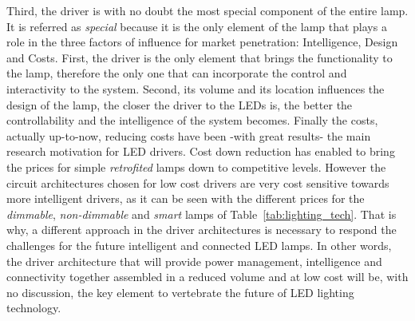 Third, the driver is with no doubt the most special component of the entire lamp. It is referred as \emph{special} because it is the only element of the lamp that plays a role in the three factors of influence for market penetration: Intelligence, Design and Costs. First, the driver is the only element that brings the functionality to the lamp, therefore the only one that can incorporate the control and interactivity to the system. Second, its volume and its location influences the design of the lamp, the closer the driver to the LEDs is, the better the controllability and the intelligence of the system becomes. Finally the costs, actually up-to-now, reducing costs have been -with great results- the main research motivation for LED drivers. Cost down reduction has enabled to bring the prices for simple \emph{retrofited} lamps down to competitive levels. However the circuit architectures chosen for low cost drivers are very cost sensitive towards more intelligent drivers, as it can be seen with the different prices for the \emph{dimmable}, \emph{non-dimmable} and \emph{smart} lamps of  Table~\ref{tab:lighting_tech}. That is why, a different approach in the driver architectures is necessary  to respond the challenges for the future intelligent and connected LED lamps. In other words, the driver architecture that will provide power management, intelligence and connectivity together assembled in a reduced volume and at low cost will be, with no discussion, the key element to vertebrate the future of LED lighting technology. 






